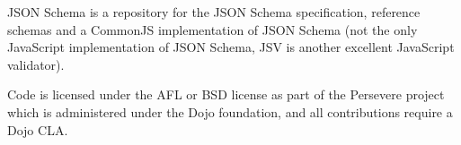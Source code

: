 J\+S\+ON Schema is a repository for the J\+S\+ON Schema specification, reference schemas and a Common\+JS implementation of J\+S\+ON Schema (not the only Java\+Script implementation of J\+S\+ON Schema, J\+SV is another excellent Java\+Script validator).

Code is licensed under the A\+FL or B\+SD license as part of the Persevere project which is administered under the Dojo foundation, and all contributions require a Dojo C\+LA. 